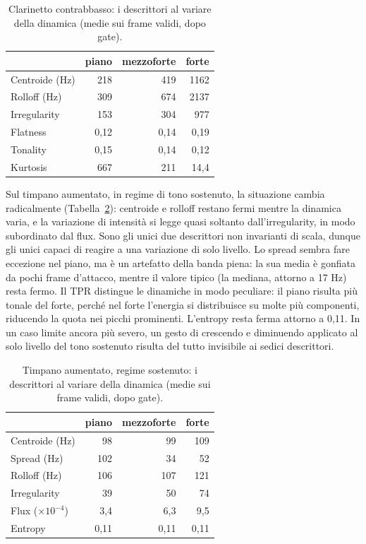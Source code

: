 \documentclass{article}
\begin{document}
\begin{table}[t]
\centering
\small
\begin{tabular}{@{}lrrr@{}}
\toprule
 & piano & mezzoforte & forte \\
\midrule
Centroide (Hz) & 218  & 419  & 1162 \\
Rolloff (Hz)   & 309  & 674  & 2137 \\
Irregularity   & 153  & 304  & 977  \\
Flatness       & 0,12 & 0,14 & 0,19 \\
Tonality       & 0,15 & 0,14 & 0,12 \\
Kurtosis       & 667  & 211  & 14,4 \\
\bottomrule
\end{tabular}
\caption{Clarinetto contrabbasso: i descrittori al variare della dinamica (medie sui frame validi, dopo gate).}
\label{tab:clarinetto}
\end{table}

Sul timpano aumentato, in regime di tono sostenuto, la situazione cambia radicalmente (Tabella~\ref{tab:timpano}): centroide e rolloff restano fermi mentre la dinamica varia, e la variazione di intensità si legge quasi soltanto dall'irregularity, in modo subordinato dal flux. Sono gli unici due descrittori non invarianti di scala, dunque gli unici capaci di reagire a una variazione di solo livello. Lo spread sembra fare eccezione nel piano, ma è un artefatto della banda piena: la sua media è gonfiata da pochi frame d'attacco, mentre il valore tipico (la mediana, attorno a 17 Hz) resta fermo. Il TPR distingue le dinamiche in modo peculiare: il piano risulta più tonale del forte, perché nel forte l'energia si distribuisce su molte più componenti, riducendo la quota nei picchi prominenti. L'entropy resta ferma attorno a 0,11. In un caso limite ancora più severo, un gesto di crescendo e diminuendo applicato al solo livello del tono sostenuto risulta del tutto invisibile ai sedici descrittori.

\begin{table}[t]
\centering
\small
\begin{tabular}{@{}lrrr@{}}
\toprule
 & piano & mezzoforte & forte \\
\midrule
Centroide (Hz)            & 98  & 99  & 109 \\
Spread (Hz)               & 102 & 34  & 52  \\
Rolloff (Hz)              & 106 & 107 & 121 \\
Irregularity              & 39  & 50  & 74  \\
Flux ($\times 10^{-4}$)   & 3,4 & 6,3 & 9,5 \\
Entropy                   & 0,11 & 0,11 & 0,11 \\
\bottomrule
\end{tabular}
\caption{Timpano aumentato, regime sostenuto: i descrittori al variare della dinamica (medie sui frame validi, dopo gate).}
\label{tab:timpano}
\end{table}
\end{document}
